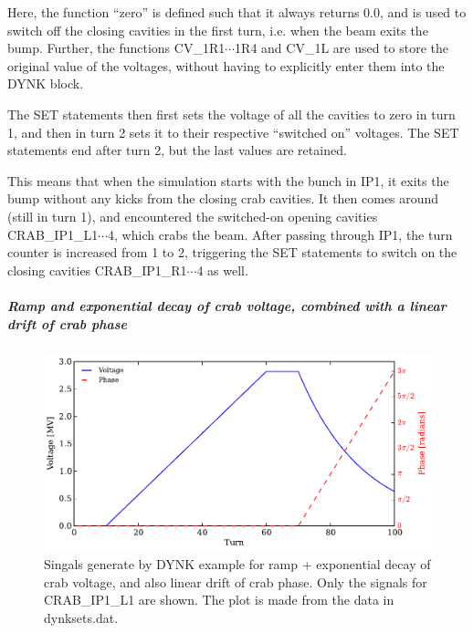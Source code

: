 \documentclass[a4paper,11pt]{report}
\begin{document}
Here, the function ``zero'' is defined such that it always returns 0.0, and is used to switch off the closing cavities in the first turn, i.e. when the beam exits the bump.
Further, the functions CV\_1R1$\cdots$1R4 and CV\_1L are used to store the original value of the voltages, without having to explicitly enter them into the DYNK block.

The SET statements then first sets the voltage of all the cavities to zero in turn 1, and then in turn 2 sets it to their respective ``switched on'' voltages.
The SET statements end after turn 2, but the last values are retained.

This means that when the simulation starts with the bunch in IP1, it exits the bump without any kicks from the closing crab cavities.
It then comes around (still in turn 1), and encountered the switched-on opening cavities CRAB\_IP1\_L1$\cdots$4, which crabs the beam.
After passing through IP1, the turn counter is increased from 1 to 2, triggering the SET statements to switch on the closing cavities CRAB\_IP1\_R1$\cdots$4 as well.

\subparagraph{Ramp and exponential decay of crab voltage, combined with a linear drift of crab phase}
\begin{figure}
  \centering
  \includegraphics{fail_voltagePhase2v2}
  \caption{Singals generate by DYNK example for ramp + exponential decay of crab voltage, and also linear drift of crab phase. Only the signals for CRAB\_IP1\_L1 are shown. The plot is made from the data in dynksets.dat.}
  \label{fig:DYNK_fail}
\end{figure}
\end{document}
